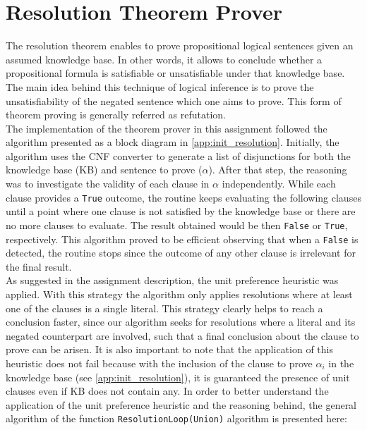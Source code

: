 \documentclass[11pt,journal,compsoc]{IEEEtran}
\begin{document}
\section{Resolution Theorem Prover}
The resolution theorem enables to prove propositional logical sentences given an assumed knowledge base.  In other words, it allows to conclude whether a propositional formula is satisfiable or unsatisfiable under that knowledge base. The main idea behind this technique of logical inference is to prove the unsatisfiability of the negated sentence which one aims to prove. This form of theorem proving is generally referred as refutation.\\
The implementation of the theorem prover in this assignment followed the algorithm presented as a block diagram in \ref{app:init_resolution}. Initially, the algorithm uses the CNF converter to generate a list of disjunctions for both the knowledge base (KB) and sentence to prove ($\alpha$). After that step, the reasoning was to investigate the validity of each clause in $\alpha$ independently. While each clause provides a \texttt{True} outcome, the routine keeps evaluating the following clauses until a point where one clause is not satisfied by the knowledge base or there are no more clauses to evaluate. The result obtained would be then \texttt{False} or \texttt{True}, respectively. This algorithm proved to be efficient observing that when a \texttt{False} is detected, the routine stops since the outcome of any other clause is irrelevant for the final result.\\
As suggested in the assignment description, the unit preference heuristic was applied. With this strategy the algorithm only applies resolutions where at least one of the clauses is a single literal. This strategy clearly helps to reach a conclusion faster, since our algorithm seeks for resolutions where a literal and its negated counterpart are involved, such that a final conclusion about the clause to prove can be arisen. It is also important to note that the application of this heuristic does not fail because with the inclusion of the clause to prove $\alpha_i$ in the knowledge base (see \ref{app:init_resolution}), it is guaranteed the presence of unit clauses even if KB does not contain any.
In order to better understand the application of the unit preference heuristic and the reasoning behind, the general algorithm of the function \texttt{ResolutionLoop(Union)} algorithm is presented here:\\
\end{document}
